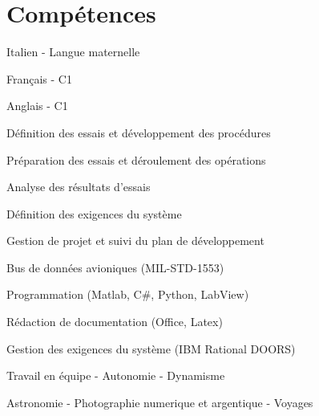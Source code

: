\documentclass[]{deedy-resume-openfont}
\begin{document}
\begin{minipage}[t]{0.37\textwidth}

\section{Compétences}
\sectionsep
{}
\vspace{1.2\topsep}
\begin{tightemize}
\item Italien - Langue maternelle
\item Français - C1
\item Anglais - C1
\end{tightemize}
\sectionsep
{}
\begin{tightemize}
\item Définition des essais et développement des procédures
\item Préparation des essais et déroulement des opérations
\item Analyse des résultats d'essais
\item Définition des exigences du système
\item Gestion de projet et suivi du plan de développement
\end{tightemize}
\sectionsep
{}
\begin{tightemize}
\item Bus de données avioniques (MIL-STD-1553)
\item Programmation (Matlab, C\#, Python, LabView)
\item Rédaction de documentation (Office, Latex)
\item Gestion des exigences du système (IBM Rational DOORS)
\end{tightemize}
\sectionsep
{}
\begin{tightemize}
\vspace{\topsep}
Travail en équipe - Autonomie - Dynamisme
\end{tightemize}
\begin{tightemize}
\vspace{\topsep}
Astronomie - Photographie numerique et argentique - Voyages
\end{tightemize}
%
%
\end{minipage} 
\end{document}
